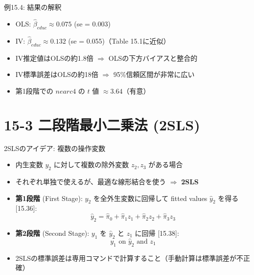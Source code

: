 \documentclass[
  ignorenonframetext,
]{beamer}
\providecommand{\tightlist}{%
  \setlength{\itemsep}{0pt}\setlength{\parskip}{0pt}}
\begin{document}
\begin{frame}{例15.4: 結果の解釈}
\label{ux4f8b15.4-ux7d50ux679cux306eux89e3ux91c8}
\begin{itemize}
\tightlist
\item
  OLS: \(\hat{\beta}_{educ} \approx 0.075\) (se = 0.003)
\item
  IV: \(\hat{\beta}_{educ} \approx 0.132\) (se = 0.055)（Table
  15.1に近似）
\item
  IV推定値はOLSの約1.8倍 \(\Rightarrow\) OLSの下方バイアスと整合的
\item
  IV標準誤差はOLSの約18倍 \(\Rightarrow\) 95\%信頼区間が非常に広い
\item
  第1段階での \(nearc4\) の \(t\) 値 \(\approx 3.64\)（有意）
\end{itemize}
\end{frame}

\section{15-3 二段階最小二乗法
(2SLS)}\label{ux4e8cux6bb5ux968eux6700ux5c0fux4e8cux4e57ux6cd5-2sls}

\begin{frame}{2SLSのアイデア: 複数の操作変数}
\label{slsux306eux30a2ux30a4ux30c7ux30a2-ux8907ux6570ux306eux64cdux4f5cux5909ux6570}
\begin{itemize}
\tightlist
\item
  内生変数 \(y_2\) に対して複数の除外変数 \(z_2, z_3\) がある場合
\item
  それぞれ単独で使えるが、最適な線形結合を使う \(\Rightarrow\)
  \textbf{2SLS}
\item
  \textbf{第1段階} (First Stage): \(y_2\) を全外生変数に回帰して fitted
  values \(\hat{y}_2\) を得る {[}15.36{]}:
  \[\hat{y}_2 = \hat{\pi}_0 + \hat{\pi}_1 z_1 + \hat{\pi}_2 z_2 + \hat{\pi}_3 z_3\]
\item
  \textbf{第2段階} (Second Stage): \(y_1\) を \(\hat{y}_2\) と \(z_1\)
  に回帰 {[}15.38{]}: \[y_1 \text{ on } \hat{y}_2 \text{ and } z_1\]
\item
  2SLSの標準誤差は専用コマンドで計算すること（手動計算は標準誤差が不正確）
\end{itemize}
\end{frame}
\end{document}
